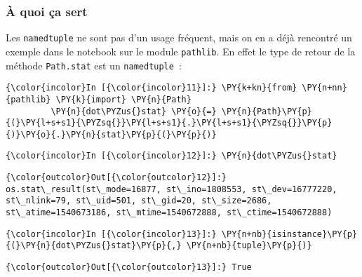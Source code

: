     \hypertarget{uxe0-quoi-uxe7a-sert}{%
\subsubsection{À quoi ça sert}\label{uxe0-quoi-uxe7a-sert}}

    Les \texttt{namedtuple} ne sont pas d'un usage fréquent, mais on en a
déjà rencontré un exemple dans le notebook sur le module
\texttt{pathlib}. En effet le type de retour de la méthode
\texttt{Path.stat} est un \texttt{namedtuple}~:

    \begin{Verbatim}[commandchars=\\\{\},frame=single,framerule=0.3mm,rulecolor=\color{cellframecolor}]
{\color{incolor}In [{\color{incolor}11}]:} \PY{k+kn}{from} \PY{n+nn}{pathlib} \PY{k}{import} \PY{n}{Path}
         \PY{n}{dot\PYZus{}stat} \PY{o}{=} \PY{n}{Path}\PY{p}{(}\PY{l+s+s1}{\PYZsq{}}\PY{l+s+s1}{.}\PY{l+s+s1}{\PYZsq{}}\PY{p}{)}\PY{o}{.}\PY{n}{stat}\PY{p}{(}\PY{p}{)}
\end{Verbatim}


    \begin{Verbatim}[commandchars=\\\{\},frame=single,framerule=0.3mm,rulecolor=\color{cellframecolor}]
{\color{incolor}In [{\color{incolor}12}]:} \PY{n}{dot\PYZus{}stat}
\end{Verbatim}


\begin{Verbatim}[commandchars=\\\{\},frame=single,framerule=0.3mm,rulecolor=\color{cellframecolor}]
{\color{outcolor}Out[{\color{outcolor}12}]:} os.stat\_result(st\_mode=16877, st\_ino=1808553, st\_dev=16777220, st\_nlink=79, st\_uid=501, st\_gid=20, st\_size=2686, st\_atime=1540673186, st\_mtime=1540672888, st\_ctime=1540672888)
\end{Verbatim}
            
    \begin{Verbatim}[commandchars=\\\{\},frame=single,framerule=0.3mm,rulecolor=\color{cellframecolor}]
{\color{incolor}In [{\color{incolor}13}]:} \PY{n+nb}{isinstance}\PY{p}{(}\PY{n}{dot\PYZus{}stat}\PY{p}{,} \PY{n+nb}{tuple}\PY{p}{)}
\end{Verbatim}


\begin{Verbatim}[commandchars=\\\{\},frame=single,framerule=0.3mm,rulecolor=\color{cellframecolor}]
{\color{outcolor}Out[{\color{outcolor}13}]:} True
\end{Verbatim}
            
